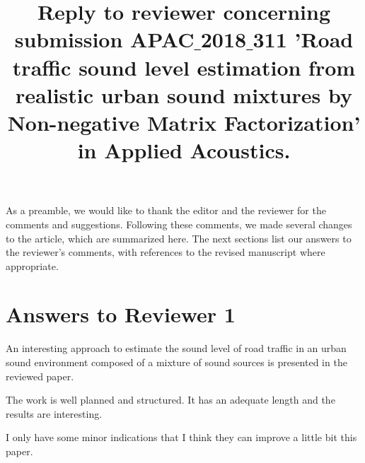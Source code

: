 \documentclass[10pt]{article}
\title{Reply to reviewer concerning submission APAC$\_$2018$\_$311 'Road traffic sound level estimation from realistic urban sound mixtures by Non-negative Matrix Factorization' in Applied Acoustics.}
\begin{document}
\maketitle

As a preamble, we would like to thank the editor and the reviewer for the comments and suggestions. Following these comments, we made several changes to the article, which are summarized here. The next sections list our answers to the reviewer's comments, with references to the revised manuscript where appropriate.

\section{Answers to Reviewer 1}

An interesting approach to estimate the sound level of road traffic in an urban sound environment composed of a mixture of sound sources is presented in the reviewed paper.

The work is well planned and structured. It has an adequate length and the results are interesting.

I only have some minor indications that I think they can improve a little bit this paper.
\end{document}
